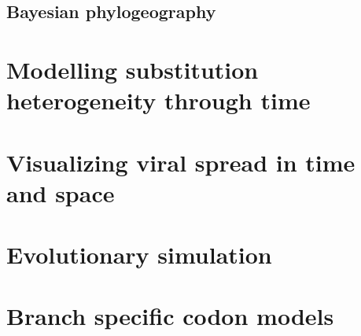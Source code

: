 \documentclass[12pt,twoside]{mitthesis}
\theoremstyle{plain}
\theoremstyle{definition}
\theoremstyle{remark}
\begin{document}
\section{Bayesian phylogeography}













\chapter{Modelling substitution heterogeneity through time}


\chapter{Visualizing viral spread in time and space}


\chapter{Evolutionary simulation}


\chapter{Branch specific codon models}



\end{document}
